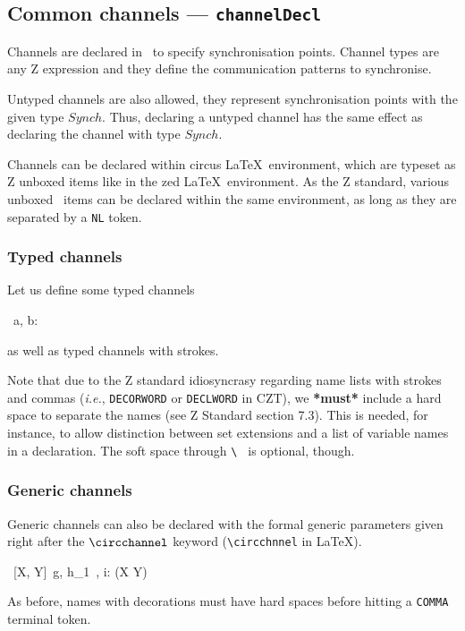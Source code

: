 \documentclass{article}
\newcommand{\grammar}[1]{\texttt{#1}}
\begin{document}
\subsection{Common channels --- \grammar{channelDecl}}

Channels are declared in \Circus\ to specify synchronisation points. Channel
types are any Z expression and they define the communication patterns to
synchronise.

Untyped channels are also allowed, they represent synchronisation points with
the given type $Synch$. Thus, declaring a untyped channel has the same effect
as declaring the channel with type $Synch$.

Channels can be declared within \textsf{circus} \LaTeX\ environment, which are
typeset as Z unboxed items like in the \textsf{zed} \LaTeX\ environment. As the
Z standard, various unboxed \Circus\ items can be declared within the same
environment, as long as they are separated by a \grammar{NL} token.

\subsubsection{Typed channels}

Let us define some typed channels
%
\begin{circus}
  \circchannel\ a, b: \nat
\end{circus}%
%
as well as typed channels with strokes.
%
%
%
Note that due to the Z standard idiosyncrasy regarding name lists with strokes
and commas (\textit{i.e.}, \grammar{DECORWORD} or \grammar{DECLWORD} in CZT),
we \textbf{*must*} include a hard space to separate the names (see Z Standard
section 7.3). This is needed, for instance, to allow distinction between set
extensions and a list of variable names in a declaration. The soft space
through \verb'\ ' is optional, though.

\subsubsection{Generic channels}

Generic channels can also be declared with the formal generic parameters given
right after the $\circchannel$ keyword (\verb'\circchnnel' in \LaTeX).
%
\begin{circus}
   \circchannel\ [X, Y]\ g, h_1~, i: (X \rel Y)
\end{circus}%
%
As before, names with decorations must have hard spaces before hitting a
\texttt{COMMA} terminal token.
\end{document}
